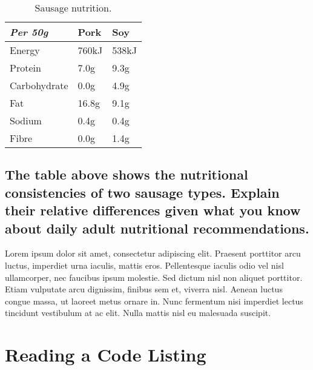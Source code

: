 \documentclass[11pt]{scrartcl} %
\begin{document}
\begin{table}[h] %
	\centering %
	\begin{tabular}{l l l}
		\toprule
		\textit{Per 50g} & \textbf{Pork} & \textbf{Soy} \\
		\midrule
		Energy & 760kJ & 538kJ\\
		Protein & 7.0g & 9.3g\\
		Carbohydrate & 0.0g & 4.9g\\
		Fat & 16.8g & 9.1g\\
		Sodium & 0.4g & 0.4g\\
		Fibre & 0.0g & 1.4g\\
		\bottomrule
	\end{tabular}
	\caption{Sausage nutrition.}
\end{table}


\subsection{The table above shows the nutritional consistencies of two sausage types. Explain their relative differences given what you know about daily adult nutritional recommendations.}

Lorem ipsum dolor sit amet, consectetur adipiscing elit. Praesent porttitor arcu luctus, imperdiet urna iaculis, mattis eros. Pellentesque iaculis odio vel nisl ullamcorper, nec faucibus ipsum molestie. Sed dictum nisl non aliquet porttitor. Etiam vulputate arcu dignissim, finibus sem et, viverra nisl. Aenean luctus congue massa, ut laoreet metus ornare in. Nunc fermentum nisi imperdiet lectus tincidunt vestibulum at ac elit. Nulla mattis nisl eu malesuada suscipit.


\section{Reading a Code Listing}


\end{document}
